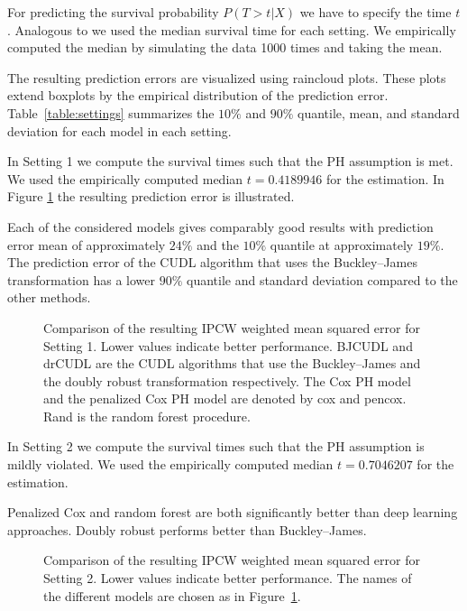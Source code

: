 \documentclass[12pt, a4paper]{scrartcl}
\theoremstyle{definition}
\theoremstyle{plain}
\numberwithin{equation}{section}
\numberwithin{figure}{section}
\numberwithin{table}{section}
\begin{document}
	For predicting the survival probability $P(T>t\vert X)$ we have to specify the time $t$.
	Analogous to \citet*{basearticle} we used the median survival time for each setting.
	We empirically computed the median by simulating the data 1000 times and taking the mean.%
	
	The resulting prediction errors are visualized using raincloud plots.
	These plots extend boxplots by the empirical distribution of the prediction error.
	Table~\ref{table:settings} summarizes the $10\%$ and $90\%$ quantile, mean, and standard deviation for each model in each setting.
	
	In Setting 1 we compute the survival times such that the PH assumption is met.
	We used the empirically computed median $t = 0.4189946$ for the estimation.
	In Figure \ref{setting1} the resulting prediction error is illustrated.
	
	Each of the considered models gives comparably good results with prediction error mean of approximately $24\%$ and the $10\%$ quantile at approximately $19\%$.
	The prediction error of the CUDL algorithm that uses the Buckley--James transformation has a lower $90\%$ quantile and standard deviation compared to the other methods.
	\begin{figure}\label{setting1}
		\centering	
		
		\vspace{-0.3cm}
		\caption{Comparison of the resulting IPCW weighted mean squared error for Setting 1. Lower values indicate better performance. BJCUDL and drCUDL are the CUDL algorithms that use the Buckley--James and the doubly robust transformation respectively. The Cox PH model and the penalized Cox PH model are denoted by cox and pencox. Rand is the random forest procedure.}
 	\end{figure}
	
	In Setting 2 we compute the survival times such that the PH assumption is mildly violated.
	We used the empirically computed median $t = 0.7046207$ for the estimation.
	
	Penalized Cox and random forest are both significantly better than deep learning approaches.
	Doubly robust performs better than Buckley--James.
	
	\begin{figure}\label{setting2}
		\centering	
		
		\vspace{-0.3cm}
		\caption{Comparison of the resulting IPCW weighted mean squared error for Setting 2. Lower values indicate better performance. The names of the different models are chosen as in Figure~\ref{setting1}.}
	\end{figure}
	
\end{document}
